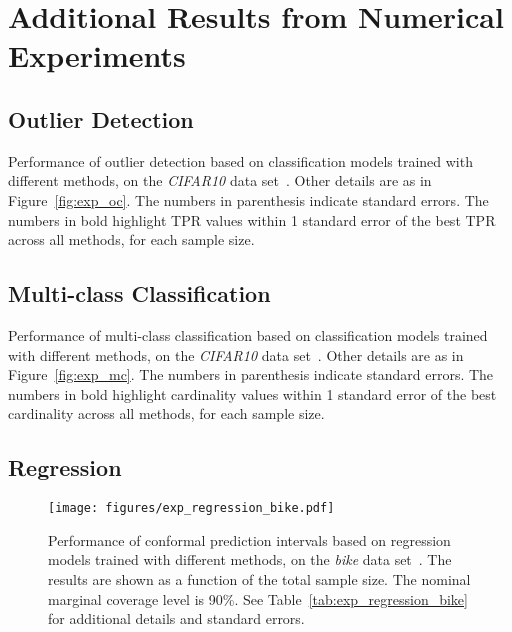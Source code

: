 \clearpage

\section{Additional Results from Numerical Experiments} \label{app:numerical-results}

\subsection{Outlier Detection}

\begin{table}[!htb]
\centering
    \caption{Performance of outlier detection based on classification models trained with different methods, on the {\em CIFAR10} data set~\cite{cifar10}. Other details are as in Figure~\ref{fig:exp_oc}. The numbers in parenthesis indicate standard errors. The numbers in bold highlight TPR values within 1 standard error of the best TPR across all methods, for each sample size.}
  \label{tab:exp_oc}
  
\end{table}

\FloatBarrier

\subsection{Multi-class Classification}

\begin{table}[!htb]
\centering
    \caption{Performance of multi-class classification based on classification models trained with different methods, on the {\em CIFAR10} data set~\cite{cifar10}. Other details are as in Figure~\ref{fig:exp_mc}. The numbers in parenthesis indicate standard errors. The numbers in bold highlight cardinality values within 1 standard error of the best cardinality across all methods, for each sample size.}
  \label{tab:exp_mc}
  
\end{table}

\FloatBarrier
\subsection{Regression}

\begin{figure}[!htb]
    \centering
    \texttt{[image: figures/exp\_regression\_bike.pdf]}
    \caption{Performance of conformal prediction intervals based on regression models trained with different methods, on the {\em bike} data set~\cite{data-bike}. The results are shown as a function of the total sample size. The nominal marginal coverage level is 90\%. See Table~\ref{tab:exp_regression_bike} for additional details and standard errors.}
    \label{fig:exp_regression_bike}
\end{figure}

